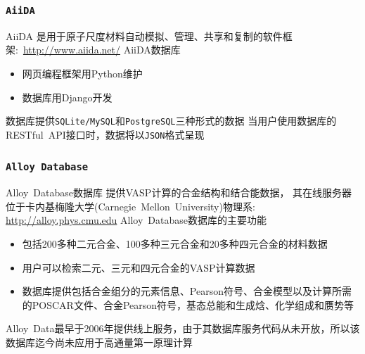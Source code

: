 {{\frame
{
\frametitle{\tt{AiiDA}}
\textrm{AiiDA}%
是用于原子尺度材料自动模拟、管理、共享和复制的软件框架:~\url{http://www.aiida.net/}
\vskip3pt
{\fontsize{8.0pt}{4.2pt}}
\vskip 3pt
\textrm{AiiDA}数据库
\begin{itemize}
	\item 网页编程框架用\textrm{Python}维护
	\item 数据库用\textrm{Django}开发\\%
		{\fontsize{7.0pt}{4.2pt}\selectfont{可满足计算物理、化学和材料科学研究的多种不同需求}}
\end{itemize}
数据库提供\texttt{SQLite/MySQL}和\texttt{PostgreSQL}三种形式的数据
\vskip 3pt
{\fontsize{8.0pt}{4.2pt}}
\vskip 5pt
当用户使用数据库的\textrm{RESTful~API}接口时，数据将以\texttt{JSON}格式呈现
}

\frame
{
\frametitle{\tt{Alloy Database}}
\textrm{Alloy~Database}数据库
提供\textrm{VASP}计算的合金结构和结合能数据，%
其在线服务器位于卡内基梅隆大学\textrm{(Carnegie~Mellon~University)}物理系:
\url{http://alloy.phys.cmu.edu}
\vskip 3pt
\textrm{Alloy~Database}数据库的主要功能
\begin{itemize}
    \setlength{\itemsep}{5pt}
	\item 包括\textrm{200}多种二元合金、\textrm{100}多种三元合金和\textrm{20}多种四元合金的材料数据
	\item 用户可以检索二元、三元和四元合金的\textrm{VASP}计算数据
	\item 数据库提供包括合金组分的元素信息、\textrm{Pearson}符号、合金模型以及计算所需的\textrm{POSCAR}文件、合金\textrm{Pearson}符号，基态总能和生成焓、化学组成和赝势等
\end{itemize}
\textrm{Alloy~Data}最早于\textrm{2006}年提供线上服务，由于其数据库服务代码从未开放，所以该数据库迄今尚未应用于高通量第一原理计算
}

}}
